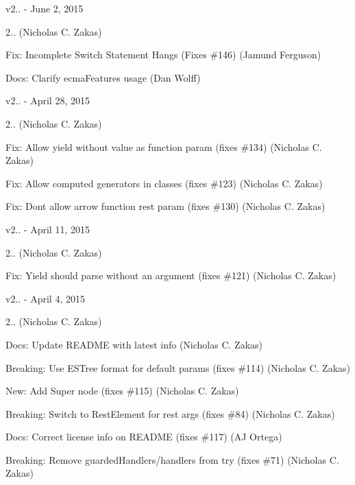 v2.. -\/ June 2, 2015


\begin{DoxyItemize}
\item 2.. (Nicholas C. Zakas)
\item Fix\+: Incomplete Switch Statement Hangs (Fixes \#146) (Jamund Ferguson)
\item Docs\+: Clarify ecma\+Features usage (Dan Wolff)
\end{DoxyItemize}

v2.. -\/ April 28, 2015


\begin{DoxyItemize}
\item 2.. (Nicholas C. Zakas)
\item Fix\+: Allow yield without value as function param (fixes \#134) (Nicholas C. Zakas)
\item Fix\+: Allow computed generators in classes (fixes \#123) (Nicholas C. Zakas)
\item Fix\+: Don\textquotesingle{}t allow arrow function rest param (fixes \#130) (Nicholas C. Zakas)
\end{DoxyItemize}

v2.. -\/ April 11, 2015


\begin{DoxyItemize}
\item 2.. (Nicholas C. Zakas)
\item Fix\+: Yield should parse without an argument (fixes \#121) (Nicholas C. Zakas)
\end{DoxyItemize}

v2.. -\/ April 4, 2015


\begin{DoxyItemize}
\item 2.. (Nicholas C. Zakas)
\item Docs\+: Update README with latest info (Nicholas C. Zakas)
\item Breaking\+: Use ESTree format for default params (fixes \#114) (Nicholas C. Zakas)
\item New\+: Add Super node (fixes \#115) (Nicholas C. Zakas)
\item Breaking\+: Switch to Rest\+Element for rest args (fixes \#84) (Nicholas C. Zakas)
\item Docs\+: Correct license info on README (fixes \#117) (AJ Ortega)
\item Breaking\+: Remove guarded\+Handlers/handlers from try (fixes \#71) (Nicholas C. Zakas)
\end{DoxyItemize}

